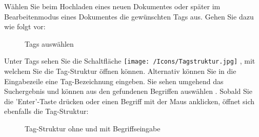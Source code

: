\vspace{\baselineskip}

Wählen Sie beim Hochladen eines neuen Dokumentes oder später im Bearbeitenmodus eines Dokumentes die gewünschten Tags aus. Gehen Sie dazu wie folgt vor: 

\begin{figure}[H]
\caption{Tags auswählen}
\end{figure}

Unter Tags  sehen Sie die Schaltfläche \texttt{[image: /Icons/Tagstruktur.jpg]} , mit welchem Sie die Tag-Struktur öffnen können. Alternativ können Sie in die Eingabezeile  eine Tag-Bezeichnung eingeben. Sie sehen umgehend das Suchergebnis und können aus den gefundenen Begriffen auswählen . Sobald Sie die 'Enter'-Taste drücken oder einen Begriff mit der Maus anklicken, öffnet sich ebenfalls die Tag-Struktur:

\begin{figure}[H]
\caption{Tag-Struktur ohne und mit Begriffseingabe}
\end{figure}

